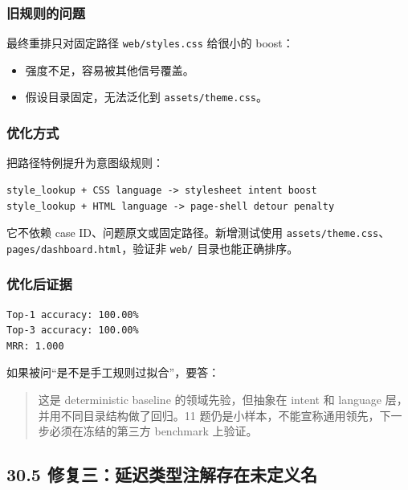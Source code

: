 \documentclass[UTF8,12pt,openany]{ctexbook}
\begin{document}
\subsubsection{旧规则的问题}

最终重排只对固定路径 \texttt{web/styles.css} 给很小的 boost：\par

\begin{itemize}
\item 强度不足，容易被其他信号覆盖。
\item 假设目录固定，无法泛化到 \texttt{assets/theme.css}。
\end{itemize}

\subsubsection{优化方式}

把路径特例提升为意图级规则：\par

\begin{lstlisting}
style_lookup + CSS language -> stylesheet intent boost
style_lookup + HTML language -> page-shell detour penalty
\end{lstlisting}

它不依赖 case ID、问题原文或固定路径。新增测试使用 \texttt{assets/theme.css}、\texttt{pages/dashboard.html}，验证非 \texttt{web/} 目录也能正确排序。\par

\subsubsection{优化后证据}

\begin{lstlisting}
Top-1 accuracy: 100.00%
Top-3 accuracy: 100.00%
MRR: 1.000
\end{lstlisting}

如果被问“是不是手工规则过拟合”，要答：\par

\begin{quote}
这是 deterministic baseline 的领域先验，但抽象在 intent 和 language 层，并用不同目录结构做了回归。11 题仍是小样本，不能宣称通用领先，下一步必须在冻结的第三方 benchmark 上验证。
\end{quote}

\subsection{30.5 修复三：延迟类型注解存在未定义名}
\end{document}
